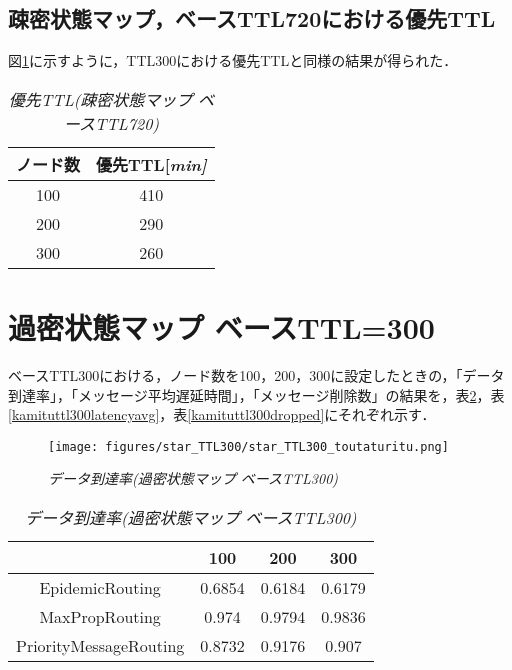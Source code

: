 \documentclass[11pt]{icsthesis}
\begin{document}
\subsection{疎密状態マップ，ベースTTL720における優先TTL}
図\ref{priorityTTL_somitsu720}に示すように，TTL300における優先TTLと同様の結果が得られた．
\begin{table}[H]
	\begin{center}
			 \caption[]{\it{優先TTL(疎密状態マップ ベースTTL720)}}
			 \label{priorityTTL_somitsu720}
			 \begin{tabular}{|c|c|}
 \hline
 ノード数&優先TTL[\it{min}]\\
 \hline
 100&410\\
 \hline
 200&290\\
 \hline
 300&260\\
 \hline
			 \end{tabular}
		 \end{center}
 \end{table}

\section{過密状態マップ ベースTTL=300}
ベースTTL300における，ノード数を100，200，300に設定したときの，「データ到達率」，「メッセージ平均遅延時間」，「メッセージ削除数」の結果を，表\ref{kamituttl300deliveryprob}，表\ref{kamituttl300latencyavg}，表\ref{kamituttl300dropped}にそれぞれ示す．

\begin{figure}[h]
\centering
\texttt{[image: figures/star\_TTL300/star\_TTL300\_toutaturitu.png]}
\caption[]{\it{データ到達率(過密状態マップ ベースTTL300)}}
\label{kamituttl300deliveryprobgraph}
\end{figure}

\begin{table}[H]
 \begin{center}
      \caption[]{\it{データ到達率(過密状態マップ ベースTTL300)}}
      \label{kamituttl300deliveryprob}
      \begin{tabular}{|c|c|c|c|}
\hline
&100&200&300\\
\hline
EpidemicRouting&0.6854&0.6184&0.6179\\
\hline
MaxPropRouting&0.974&0.9794&0.9836\\
\hline
PriorityMessageRouting&0.8732&0.9176&0.907\\
\hline
      \end{tabular}
    \end{center}
\end{table}
\end{document}
